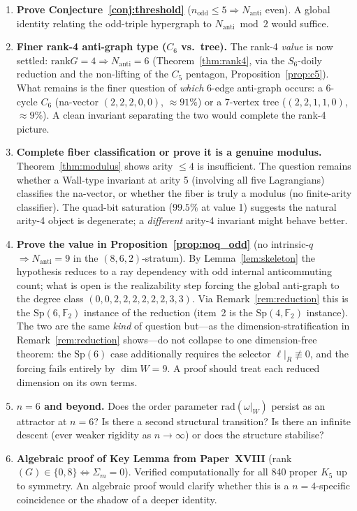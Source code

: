 \documentclass[11pt,a4paper]{article}
\theoremstyle{remark}
\newcommand{\Sp}{\mathrm{Sp}}
\newcommand{\rad}{\mathrm{rad}}
\newcommand{\rank}{\mathrm{rank}}
\newcommand{\Nanti}{N_{\mathrm{anti}}}
\begin{document}
\begin{enumerate}
\item \textbf{Prove Conjecture~\ref{conj:threshold}} ($n_{\mathrm{odd}}\le5\Rightarrow
  \Nanti$ even).  A global identity relating the odd-triple hypergraph to $\Nanti\bmod2$
  would suffice.

\item \textbf{Finer rank-4 anti-graph type ($C_6$ vs.\ tree).}
  The rank-4 \emph{value} is now settled: $\rank G=4\Rightarrow\Nanti=6$
  (Theorem~\ref{thm:rank4}, via the $S_6$-doily reduction and the
  non-lifting of the $C_5$ pentagon, Proposition~\ref{prop:c5}). What remains is the
  finer question of \emph{which} $6$-edge anti-graph occurs: a $6$-cycle $C_6$
  (na-vector $(2,2,2,0,0)$, $\approx91\%$) or a $7$-vertex tree
  ($(2,2,1,1,0)$, $\approx9\%$). A clean invariant separating the two would complete
  the rank-4 picture.

\item \textbf{Complete fiber classification or prove it is a genuine modulus.}
  Theorem~\ref{thm:modulus} shows arity $\le4$ is insufficient.  The question remains
  whether a Wall-type invariant at arity 5 (involving all five Lagrangians) classifies
  the na-vector, or whether the fiber is truly a modulus (no finite-arity classifier).
  The quad-bit saturation ($99.5\%$ at value 1) suggests the natural arity-4 object is
  degenerate; a \emph{different} arity-4 invariant might behave better.

\item \textbf{Prove the value in Proposition~\ref{prop:noq_odd}}
  (no intrinsic-$q$ $\Rightarrow\Nanti=9$ in the $(8,6,2)$-stratum). By
  Lemma~\ref{lem:skeleton} the hypothesis reduces to a ray dependency with odd
  internal anticommuting count; what is open is the realizability step forcing the
  global anti-graph to the degree class $(0,0,2,2,2,2,2,2,3,3)$. Via
  Remark~\ref{rem:reduction} this is the $\Sp(6,\mathbb F_2)$ instance of the
  reduction (item~2 is the $\Sp(4,\mathbb F_2)$ instance). The two are the same
  \emph{kind} of question but---as the dimension-stratification in
  Remark~\ref{rem:reduction} shows---do not collapse to one dimension-free theorem:
  the $\Sp(6)$ case additionally requires the selector $\ell|_R\not\equiv0$, and the
  forcing fails entirely by $\dim W=9$. A proof should treat each reduced dimension
  on its own terms.

\item \textbf{$n=6$ and beyond.}  Does the order parameter $\rad(\omega|_W)$ persist
  as an attractor at $n=6$?  Is there a second structural transition?  Is there an
  infinite descent (ever weaker rigidity as $n\to\infty$) or does the structure
  stabilise?

\item \textbf{Algebraic proof of Key Lemma from Paper~XVIII} (rank$(G)\in\{0,8\}
  \Leftrightarrow\Sigma_m=0$).  Verified computationally for all 840 proper $K_5$
  up to symmetry.  An algebraic proof would clarify whether this is a $n=4$-specific
  coincidence or the shadow of a deeper identity.
\end{enumerate}
\end{document}
